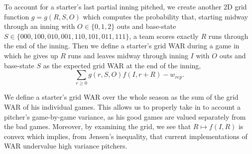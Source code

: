 \documentclass[12pt]{article}
\begin{document}
To account for a starter's last partial inning pitched, we create another 2D grid function $g=g(R,S,O)$ which computes the probability that, starting midway through an inning with $O \in \{0,1,2\}$ outs and base-state $S \in \{000,100,010,001,110,101,011,111\}$, a team scores exactly $R$ runs through the end of the inning. Then we define a starter's grid WAR during a game in which he gives up $R$ runs and leaves midway through inning $I$ with $O$ outs and base-state $S$ as the expected grid WAR at the end of the inning,
$$\sum_{r \geq 0} g(r,S,O) f(I,r+R) - w_{rep}.$$ 

We define a starter's grid WAR over the whole season as the sum of the grid WAR of his individual games. This allows us to properly take in to account a pitcher's game-by-game variance, as his good games are valued separately from the bad games. Moreover, by examining the grid, we see that $R \mapsto f(I,R)$ is convex which implies, from Jensen's inequality,  that current implementations of WAR undervalue high variance pitchers.



\end{document}

